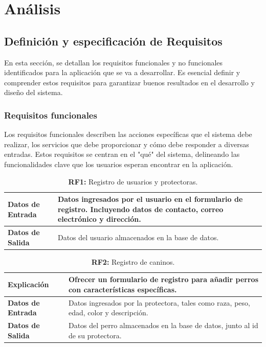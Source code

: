 \documentclass[a4paper, 12pt]{article}
\begin{document}
\newpage
\section{Análisis}

\subsection{Definición y especificación de Requisitos}

En esta sección, se detallan los requisitos funcionales y no funcionales identificados para la aplicación que se va a desarrollar. Es esencial definir y comprender estos requisitos para garantizar buenos resultados en el desarrollo y diseño del sistema.

\subsubsection{Requisitos funcionales}

Los requisitos funcionales describen las acciones específicas que el sistema debe realizar, los servicios que debe proporcionar y cómo debe responder a diversas entradas. Estos requisitos se centran en el "qué" del sistema, delineando las funcionalidades clave que los usuarios esperan encontrar en la aplicación.

\begin{table}[H]
\captionsetup{justification=raggedright,singlelinecheck=false}
\caption{\textbf{RF1:} Registro de usuarios y protectoras.}
\label{tab:RF1}
	\begin{tabular}{|m{5cm}|m{10cm}|}
	\hline
	\textbf{Datos de Entrada} & Datos ingresados por el usuario en el formulario de registro. Incluyendo datos de contacto, correo electrónico y dirección. \\ 
	\hline
	\textbf{Datos de Salida} & Datos del usuario almacenados en la base de datos. \\ 
	\hline
\end{tabular}
\end{table}

\begin{table}[H]
\captionsetup{justification=raggedright,singlelinecheck=false}
\caption{\textbf{RF2:} Registro de caninos.}
\label{tab:RF2}
	\begin{tabular}{|m{5cm}|m{10cm}|}
	\hline
	\textbf{Explicación} & Ofrecer un formulario de registro para añadir perros con características específicas. \\ 
	\hline
	\textbf{Datos de Entrada} & Datos ingresados por la protectora, tales como raza, peso, edad, color y descripción. \\ 
	\hline
	\textbf{Datos de Salida} & Datos del perro almacenados en la base de datos, junto al id de su protectora. \\ 
	\hline
\end{tabular}
\end{table}
\end{document}
